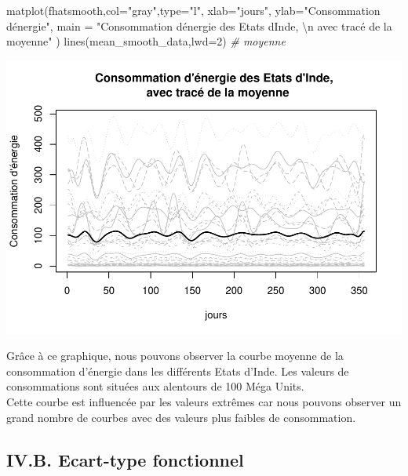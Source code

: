 \documentclass[
]{article}
\newenvironment{Shaded}{\begin{snugshade}}{\end{snugshade}}
\newcommand{\AttributeTok}[1]{\textcolor[rgb]{0.77,0.63,0.00}{#1}}
\newcommand{\CommentTok}[1]{\textcolor[rgb]{0.56,0.35,0.01}{\textit{#1}}}
\newcommand{\DecValTok}[1]{\textcolor[rgb]{0.00,0.00,0.81}{#1}}
\newcommand{\FunctionTok}[1]{\textcolor[rgb]{0.00,0.00,0.00}{#1}}
\newcommand{\NormalTok}[1]{#1}
\newcommand{\SpecialCharTok}[1]{\textcolor[rgb]{0.00,0.00,0.00}{#1}}
\newcommand{\StringTok}[1]{\textcolor[rgb]{0.31,0.60,0.02}{#1}}
\begin{document}
\begin{Shaded}
\begin{Highlighting}[]
\FunctionTok{matplot}\NormalTok{(fhatsmooth,}\AttributeTok{col=}\StringTok{"gray"}\NormalTok{,}\AttributeTok{type=}\StringTok{"l"}\NormalTok{,}
        \AttributeTok{xlab=}\StringTok{"jours"}\NormalTok{,}
        \AttributeTok{ylab=}\StringTok{"Consommation d\textquotesingle{}énergie"}\NormalTok{, }
        \AttributeTok{main =} \StringTok{"Consommation d\textquotesingle{}énergie des Etats d\textquotesingle{}Inde, }\SpecialCharTok{\textbackslash{}n}\StringTok{ avec tracé de la moyenne"}
\NormalTok{        )}
\FunctionTok{lines}\NormalTok{(mean\_smooth\_data,}\AttributeTok{lwd=}\DecValTok{2}\NormalTok{) }\CommentTok{\# moyenne}
\end{Highlighting}
\end{Shaded}

\includegraphics{Projet_CHESNAIS_GUIBERT_files/figure-latex/unnamed-chunk-34-1.pdf}

Grâce à ce graphique, nous pouvons observer la courbe moyenne de la
consommation d'énergie dans les différents Etats d'Inde. Les valeurs de
consommations sont situées aux alentours de 100 Méga Units.\\
Cette courbe est influencée par les valeurs extrêmes car nous pouvons
observer un grand nombre de courbes avec des valeurs plus faibles de
consommation.

\hypertarget{iv.b.-ecart-type-fonctionnel}{%
\subsection{IV.B. Ecart-type
fonctionnel}\label{iv.b.-ecart-type-fonctionnel}}
\end{document}
